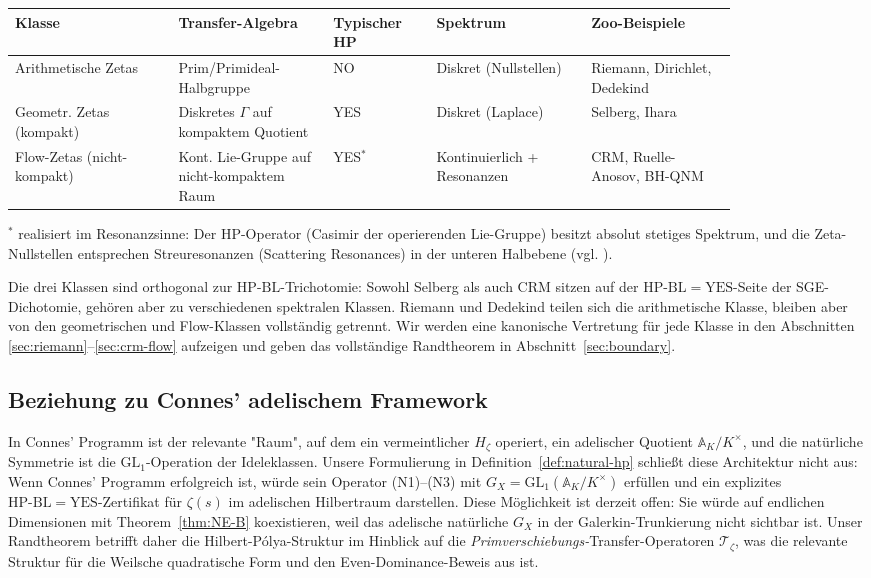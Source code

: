 \documentclass[11pt]{article}
\theoremstyle{definition}
\theoremstyle{remark}
\newcommand{\HBL}{\mathrm{HP\text{-}BL}}
\begin{document}
\begin{center}
\small
\setlength{\tabcolsep}{3pt}
\renewcommand{\arraystretch}{1.18}
\begin{tabular}{@{}p{0.19\linewidth} p{0.18\linewidth} p{0.12\linewidth} p{0.18\linewidth} p{0.17\linewidth}@{}}
\toprule
\textbf{Klasse} & \textbf{Transfer-Algebra} & \textbf{Typischer HP} & \textbf{Spektrum} & \textbf{Zoo-Beispiele} \\
\midrule
Arithmetische Zetas & Prim/Primideal-Halbgruppe & NO & Diskret (Nullstellen) & Riemann, Dirichlet, Dedekind \\
Geometr. Zetas (kompakt) & Diskretes $\Gamma$ auf kompaktem Quotient & YES & Diskret (Laplace) & Selberg, Ihara \\
Flow-Zetas (nicht-kompakt) & Kont. Lie-Gruppe auf nicht-kompaktem Raum & YES${}^*$ & Kontinuierlich + Resonanzen & CRM, Ruelle-Anosov, BH-QNM \\
\bottomrule
\end{tabular}
\end{center}
${}^*$ realisiert im Resonanzsinne: Der HP-Operator (Casimir der
operierenden Lie-Gruppe) besitzt absolut stetiges Spektrum, und die Zeta-Nullstellen
entsprechen Streuresonanzen (Scattering Resonances) in der unteren Halbebene (vgl. \cite{DyatlovZworski2019}).

Die drei Klassen sind orthogonal zur $\HBL$-Trichotomie: Sowohl Selberg als auch CRM
sitzen auf der $\HBL = \mathrm{YES}$-Seite der SGE-Dichotomie, gehören aber zu
verschiedenen spektralen Klassen. Riemann und Dedekind teilen sich die arithmetische Klasse,
bleiben aber von den geometrischen und Flow-Klassen vollständig getrennt. Wir werden eine kanonische
Vertretung für jede Klasse in den Abschnitten \ref{sec:riemann}--\ref{sec:crm-flow} aufzeigen
und geben das vollständige Randtheorem in Abschnitt~\ref{sec:boundary}.

\subsection{Beziehung zu Connes' adelischem Framework}

In Connes' Programm \cite{Connes1999, Connes2026} ist der relevante
"Raum", auf dem ein vermeintlicher $H_\zeta$ operiert, ein adelischer
Quotient $\mathbb{A}_K / K^\times$, und die natürliche Symmetrie ist die
$\mathrm{GL}_1$-Operation der Ideleklassen. Unsere Formulierung in Definition~\ref{def:natural-hp}
schließt diese Architektur nicht aus: Wenn Connes' Programm erfolgreich ist,
würde sein Operator (N1)--(N3) mit $G_X = \mathrm{GL}_1(\mathbb{A}_K/K^\times)$
erfüllen und ein explizites $\HBL = \mathrm{YES}$-Zertifikat für $\zeta(s)$
im adelischen Hilbertraum darstellen. Diese Möglichkeit ist derzeit offen:
Sie würde auf endlichen Dimensionen mit Theorem~\ref{thm:NE-B} koexistieren,
weil das adelische natürliche $G_X$ in der Galerkin-Trunkierung nicht sichtbar ist.
Unser Randtheorem betrifft daher die Hilbert-P\'olya-Struktur im Hinblick auf die
\emph{Primverschiebungs-}Transfer-Operatoren $\mathcal{T}_\zeta$, was die relevante
Struktur für die Weilsche quadratische Form und den Even-Dominance-Beweis
aus \cite{Geiger2026RHII} ist.
\end{document}
